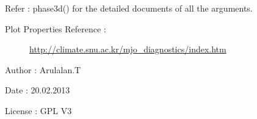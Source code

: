 \documentclass[letterpaper,10pt,english]{sphinxmanual}
\begin{document}
\begin{fulllineitems}
\begin{description}
\end{description}

Refer : phase3d() for the detailed documents of all the arguments.
\begin{description}
\item[{Plot Properties Reference :}] \leavevmode
\href{http://climate.snu.ac.kr/mjo\_diagnostics/index.htm}{http://climate.snu.ac.kr/mjo\_diagnostics/index.htm}

\end{description}

Author : Arulalan.T

Date : 20.02.2013

License : GPL V3

\end{fulllineitems}

\end{document}
